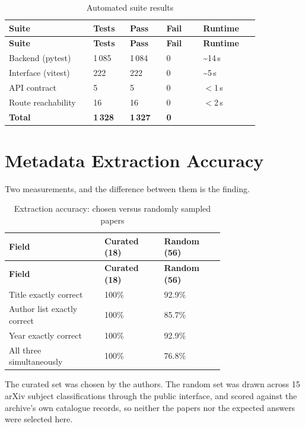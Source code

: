 \documentclass[12pt,a4paper]{report}
\begin{document}
\begin{longtable}{@{}p{0.30\linewidth}p{0.13\linewidth}p{0.13\linewidth}p{0.13\linewidth}p{0.20\linewidth}@{}}
\caption{Automated suite results}\label{tab:suites}\\
\toprule
\textbf{Suite} & \textbf{Tests} & \textbf{Pass} & \textbf{Fail} &
\textbf{Runtime} \\
\midrule
\endfirsthead
\toprule
\textbf{Suite} & \textbf{Tests} & \textbf{Pass} & \textbf{Fail} &
\textbf{Runtime} \\
\midrule
\endhead

Backend (pytest)    & 1\,085 & 1\,084 & 0 & \textasciitilde14\,s \\
Interface (vitest)  & 222 & 222 & 0 & \textasciitilde5\,s \\
API contract        & 5   & 5   & 0 & $<$1\,s \\
Route reachability  & 16  & 16  & 0 & $<$2\,s \\
\midrule
\textbf{Total}      & \textbf{1\,328} & \textbf{1\,327} & \textbf{0} & \\
\bottomrule
\end{longtable}

\section{Metadata Extraction Accuracy}

Two measurements, and the difference between them is the finding.

\begin{longtable}{@{}p{0.32\linewidth}p{0.20\linewidth}p{0.20\linewidth}@{}}
\caption{Extraction accuracy: chosen versus randomly sampled papers}\label{tab:acc}\\
\toprule
\textbf{Field} & \textbf{Curated (18)} & \textbf{Random (56)} \\
\midrule
\endfirsthead
\toprule
\textbf{Field} & \textbf{Curated (18)} & \textbf{Random (56)} \\
\midrule
\endhead

Title exactly correct       & 100\% & 92.9\% \\
Author list exactly correct & 100\% & 85.7\% \\
Year exactly correct        & 100\% & 92.9\% \\
All three simultaneously    & 100\% & 76.8\% \\
\bottomrule
\end{longtable}

The curated set was chosen by the authors. The random set was drawn across 15
arXiv subject classifications through the public interface, and scored against
the archive's own catalogue records, so neither the papers nor the expected
answers were selected here.
\end{document}

